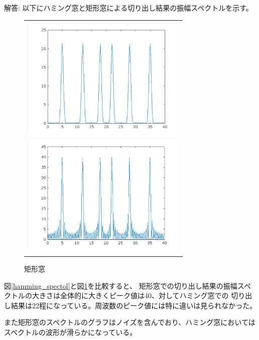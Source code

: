 \documentclass[a4paper,11pt]{ltjsarticle}
\begin{document}
解答:
以下にハミング窓と矩形窓による切り出し結果の振幅スペクトルを示す。
\begin{figure}[H]
\begin{center}
\begin{tabular}{c}
\begin{minipage}{0.5\hsize}
\begin{center}
\includegraphics[width=8cm]{DSP1/r1_k2_4.png}
\end{center}
\caption{ハミング窓}
\label{hamming_spectol}
\end{minipage}
\begin{minipage}{0.5\hsize}
\begin{center}
\includegraphics[width=8cm]{DSP1/R1_K2_7_kukei.png}
\end{center}
\caption{矩形窓}
\label{kukei_spectol}
\end{minipage}
\end{tabular}
\end{center}
\end{figure}

図\ref{hamming_spectol}と図\ref{kukei_spectol}を比較すると、
矩形窓での切り出し結果の振幅スペクトルの大きさは全体的に大きくピーク値は40、対してハミング窓での
切り出し結果は22程になっている。周波数のピーク値には特に違いは見られなかった。

また矩形窓のスペクトルのグラフはノイズを含んでおり、ハミング窓においてはスペクトルの波形が滑らかになっている。
\end{document}
